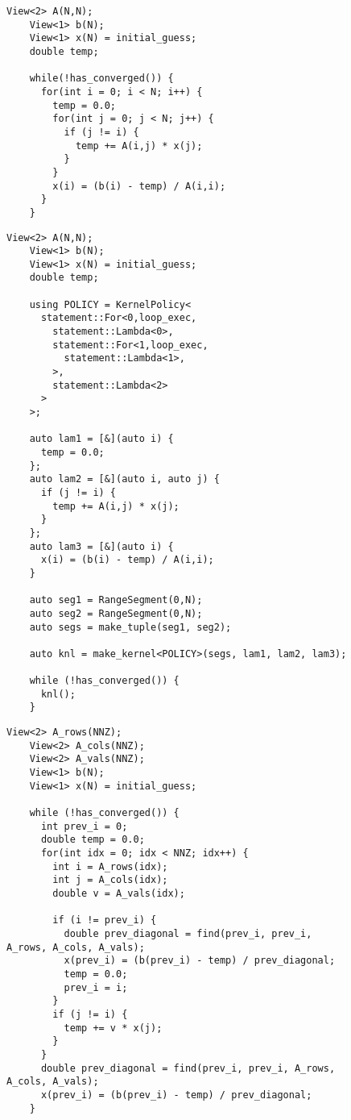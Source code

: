   \begin{figure}
    \begin{lstlisting}[caption={C-like version of Gauss-Seidel iteration},label=CppGauSei]
    View<2> A(N,N);
    View<1> b(N);
    View<1> x(N) = initial_guess;
    double temp;
    
    while(!has_converged()) {
      for(int i = 0; i < N; i++) {
        temp = 0.0;
        for(int j = 0; j < N; j++) {
          if (j != i) {
            temp += A(i,j) * x(j);
          }
        }
        x(i) = (b(i) - temp) / A(i,i);
      }
    }
    \end{lstlisting}
    \end{figure}
    
    \begin{figure}
    \begin{lstlisting}[caption={\dense{} version of Gauss-Seidel iteration},label=DenseGauSei]
    View<2> A(N,N);
    View<1> b(N);
    View<1> x(N) = initial_guess;
    double temp;
    
    using POLICY = KernelPolicy<
      statement::For<0,loop_exec,
        statement::Lambda<0>,
        statement::For<1,loop_exec,
          statement::Lambda<1>,
        >,
        statement::Lambda<2>
      >
    >;
    
    auto lam1 = [&](auto i) {
      temp = 0.0;
    };
    auto lam2 = [&](auto i, auto j) {
      if (j != i) {
        temp += A(i,j) * x(j);
      }
    };
    auto lam3 = [&](auto i) {
      x(i) = (b(i) - temp) / A(i,i);
    }
    
    auto seg1 = RangeSegment(0,N);
    auto seg2 = RangeSegment(0,N);
    auto segs = make_tuple(seg1, seg2);
    
    auto knl = make_kernel<POLICY>(segs, lam1, lam2, lam3);
    
    while (!has_converged()) {
      knl();
    }
    \end{lstlisting}
    \end{figure}
    
    \begin{figure}
    \begin{lstlisting}[caption={\specialized{} version of Gauss-Seidel iteration},label=SpecializedGauSei]
    View<2> A_rows(NNZ);
    View<2> A_cols(NNZ);
    View<2> A_vals(NNZ);
    View<1> b(N);
    View<1> x(N) = initial_guess;
    
    while (!has_converged()) {
      int prev_i = 0;
      double temp = 0.0;
      for(int idx = 0; idx < NNZ; idx++) {
        int i = A_rows(idx);
        int j = A_cols(idx);
        double v = A_vals(idx);
    
        if (i != prev_i) {
          double prev_diagonal = find(prev_i, prev_i, A_rows, A_cols, A_vals);
          x(prev_i) = (b(prev_i) - temp) / prev_diagonal;
          temp = 0.0;
          prev_i = i;
        }
        if (j != i) {
          temp += v * x(j);
        } 
      }
      double prev_diagonal = find(prev_i, prev_i, A_rows, A_cols, A_vals);
      x(prev_i) = (b(prev_i) - temp) / prev_diagonal;
    }
    \end{lstlisting}
    \end{figure}
    
